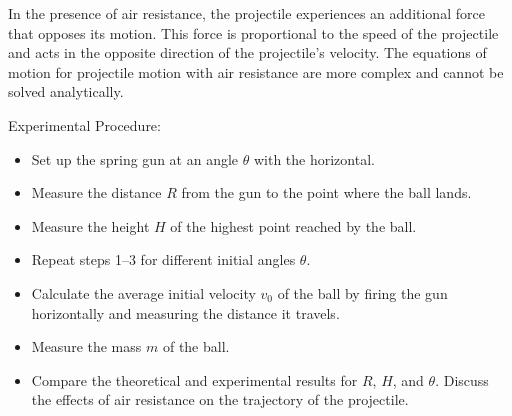 In the presence of air resistance, the projectile experiences an additional force that opposes its motion. This force is proportional to the speed of the projectile and acts in the opposite direction of the projectile's velocity. The equations of motion for projectile motion with air resistance are more complex and cannot be solved analytically.

\newpage
\thispagestyle{plain}

Experimental Procedure:

\begin{itemize}
	\item Set up the spring gun at an angle $\theta$ with the horizontal.
	\item Measure the distance $R$ from the gun to the point where the ball lands.
	\item Measure the height $H$ of the highest point reached by the ball.
	\item Repeat steps 1--3 for different initial angles $\theta$.
	\item Calculate the average initial velocity $v_0$ of the ball by firing the gun horizontally and measuring the distance it travels.
	\item Measure the mass $m$ of the ball.
	\item Compare the theoretical and experimental results for $R$, $H$, and $\theta$. Discuss the effects of air resistance on the trajectory of the projectile.
\end{itemize}
